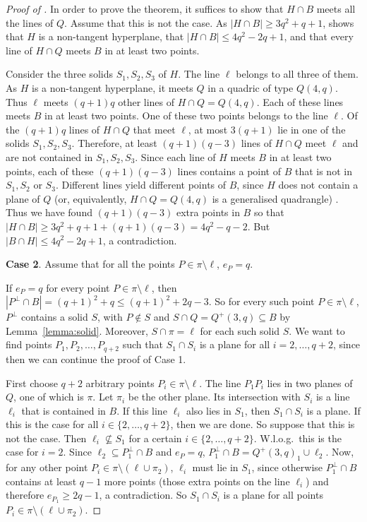 \documentclass[a4paper]{article}
\theoremstyle{definition}
\begin{document}
\begin{proof}[Proof of ]
In order to prove the theorem, it suffices to show that $ H \cap B$ meets all the lines of $Q$. Assume
that this is not the case. As $|H \cap B| \geq 3q^2 + q + 1$,  shows that $H$ is a
non-tangent hyperplane, that $|H \cap B| \leq  4q^2 - 2q+1$, and that every line of $H \cap  Q$  meets
$B$ in at least two points.

Consider the three solids $S_1, S_2, S_3$  of $H$. The line $\ell$ belongs to all three of them. As $H$ is
a non-tangent hyperplane, it meets $Q$  in a quadric of type $Q(4, q)$. Thus $\ell$ meets $ (q + 1)q$
other lines of $H \cap Q=Q(4,q)$. Each of these lines meets $B$ in at least two points. One of these two points
belongs to the line $\ell$. Of the $(q + 1)q$ lines of $H \cap  Q$  that meet $\ell$, at most $3(q + 1)$  lie in one of the solids
$S_1,S_2,S_3$. Therefore, at least $(q + 1)(q - 3)$ lines of $H \cap Q$  meet $\ell$ and are not contained in
$S_1,S_2,S_3$. Since each line of $H$ meets $B$ in at least two points, each of these $ (q+ 1)(q - 3)$ 
lines contains a point of $B$ that is not in $S_1,S_2$ or $S_3$. Different lines yield different points of
$B$, since $H$ does not contain a plane of $Q$ (or, equivalently, $H \cap Q = Q(4,q)$ is a generalised quadrangle) \cite{MR2508121}. Thus we have found $ (q+ 1)(q- 3)$  extra points in
$B$ so that $|H\cap B |\geq 3q^2 + q + 1 + (q + 1)(q- 3)=4q^2-q-2$. But $|B\cap H|\leq  4q^2 - 2q+1$, a contradiction.

\bigskip

{\bf Case 2}. Assume that for all the  points $P\in\pi\setminus \ell$, $e_P=q$.

\bigskip
    
    If $e_P=q$ for every point $P\in\pi\setminus\ell$, then $|P^\perp \cap B|=(q+1)^2+q\leq (q+1)^2+2q-3$. So for every such point $P\in \pi\setminus \ell$, $P^\perp$ contains a solid $S$, with $P\notin S$ and $S\cap Q = Q^+(3,q)\subseteq B$ by Lemma~\ref{lemma:solid}. Moreover, $S\cap\pi=\ell$ for each such solid $S$. We want to find points $P_1,P_2,\dots,P_{q+2}$  such that $S_1\cap S_i$ is a plane for all $i=2,\dots,q+2$, since then we can continue the proof of Case 1.
    
    First choose $q+2$ arbitrary points $P_i\in\pi\setminus\ell$. The line $P_1P_i$ lies in two planes of $Q$, one of which is $\pi$. Let $\pi_i$ be the other plane. Its intersection with $S_i$ is a line $\ell_i$ that is contained in $B$. If this line $\ell_i$ also lies in $S_1$, then $S_1\cap S_i$ is a plane. If this is the case for all $i\in\{2,\dots,q+2\}$, then we are done. So suppose that this is not the case. Then $\ell_i\not\subseteq S_1$ for a certain $i\in\{2,\dots,q+2\}$. W.l.o.g.\ this is the case for $i=2$. Since $\ell_2\subseteq P_1^\perp\cap B$ and $e_P=q$, $P_1^\perp\cap B=Q^+(3,q)_1\cup\ell_2$. Now, for any other point $P_i\in\pi\setminus(\ell\cup\pi_2)$, $\ell_i$ must lie in $S_1$, since otherwise $P_1^\perp\cap B$ contains at least $q-1$ more points (those extra points on the line $\ell_i$) and therefore $e_{P_1}\geq 2q-1$, a contradiction. So $S_1\cap S_i$ is a plane for all points $P_i\in\pi\setminus(\ell\cup\pi_2)$.


\end{proof}
\end{document}
